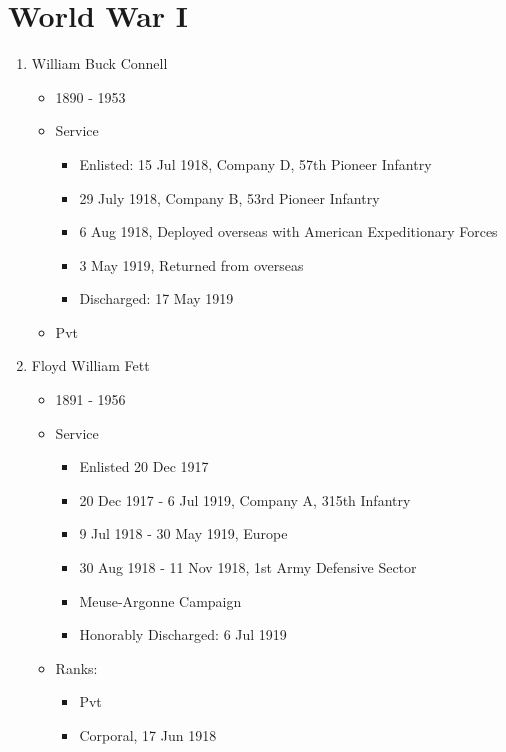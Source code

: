 \documentclass[11pt,letter]{book}
\begin{document}

\chapter{World War I}

\begin{enumerate}

\item William Buck Connell
\begin{itemize}
\item 1890 - 1953
\item Service
\begin{itemize}
\item Enlisted: 15 Jul 1918, Company D, 57th Pioneer Infantry
\item 29 July 1918, Company B, 53rd Pioneer Infantry
\item 6 Aug 1918, Deployed overseas with American Expeditionary Forces
\item 3 May 1919, Returned from overseas
\item Discharged:  17 May 1919
\end{itemize}
\item Pvt
\end{itemize}

\item Floyd William Fett
\begin{itemize}
\item 1891 - 1956
\item Service
\begin{itemize}
\item Enlisted 20 Dec 1917
\item 20 Dec 1917 - 6 Jul 1919, Company A, 315th Infantry
\item 9 Jul 1918 - 30 May 1919, Europe
\item 30 Aug 1918 - 11 Nov 1918, 1st Army Defensive Sector
\item Meuse-Argonne Campaign
\item Honorably Discharged:  6 Jul 1919
\end{itemize}
\item Ranks:
\begin{itemize}
\item Pvt
\item Corporal, 17 Jun 1918
\end{itemize}
\end{itemize}


\end{enumerate}
\end{document}
